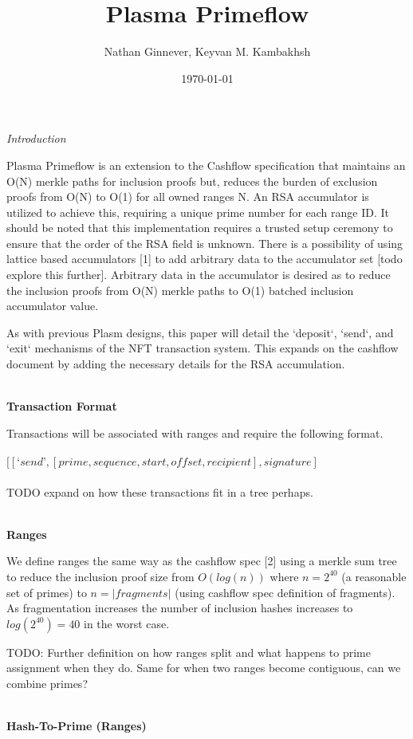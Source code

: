 \documentclass[12pt]{article}
\title{Plasma Primeflow}
\author{Nathan Ginnever, Keyvan M. Kambakhsh}
\date{\today}
\begin{document}
\maketitle
\centerline{\textit{Introduction}}

Plasma Primeflow is an extension to the Cashflow specification that maintains an O(N) merkle paths for inclusion proofs but, reduces the burden of exclusion proofs from O(N) to O(1) for all owned ranges N. An RSA accumulator is utilized to achieve this, requiring a unique prime number for each range ID. It should be noted that this implementation requires a trusted setup ceremony to ensure that the order of the RSA field is unknown. There is a possibility of using lattice based accumulators [1] to add arbitrary data to the accumulator set [todo explore this further]. Arbitrary data in the accumulator is desired as to reduce the inclusion proofs from O(N) merkle paths to O(1) batched inclusion accumulator value. 

As with previous Plasm designs, this paper will detail the `deposit`, `send`, and `exit` mechanisms of the NFT transaction system. This expands on the cashflow document by adding the necessary details for the RSA accumulation.
\\
\\
\centerline{\textbf{Transaction Format}}

Transactions will be associated with ranges and require the following format.
\\
\\
$[[‘send’, [prime, sequence, start, offset, recipient], signature]$
\\
\\
TODO expand on how these transactions fit in a tree perhaps.
\\
\\
\centerline{\textbf{Ranges}}

We define ranges the same way as the cashflow spec [2] using a merkle sum tree to reduce the inclusion proof size from $O(log(n))$ where $n = 2^{40}$ (a reasonable set of primes) to $n = |fragments|$ (using cashflow spec definition of fragments). As fragmentation increases the number of inclusion hashes increases to $log(2^{40}) = 40$ in the worst case. 

TODO: Further definition on how ranges split and what happens to prime assignment when they do. Same for when two ranges become contiguous, can we combine primes?
\\
\\
\centerline{\textbf{Hash-To-Prime (Ranges)}}
\end{document}
